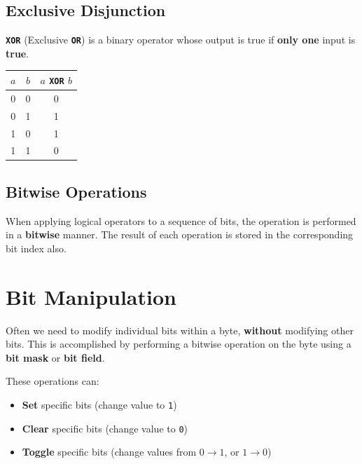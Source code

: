 \documentclass[a4paper]{report}
\newcommand{\keywordinline}[1]{\textcolor[rgb]{0.00,0.50,0.00}{\textbf{\texttt{#1}}}}
\begin{document}
\subsection{Exclusive Disjunction}
\keywordinline{XOR} (Exclusive \keywordinline{OR}) is a binary operator whose output is true if \textbf{only one} input is \textbf{true}.
\begin{table}[H]
    \centering
    \begin{tabular}{c c c}
        \toprule
        \textbf{\(a\)} & \textbf{\(b\)} & \(a\) \keywordinline{XOR} \(b\) \\
        \midrule
        0              & 0              & 0                               \\
        0              & 1              & 1                               \\
        1              & 0              & 1                               \\
        1              & 1              & 0                               \\
        \bottomrule
    \end{tabular}
\end{table}
\subsection{Bitwise Operations}
When applying logical operators to a sequence of bits, the operation is performed in a \textbf{bitwise} manner. The result of each operation is stored in the corresponding bit index also.
\section{Bit Manipulation}
Often we need to modify individual bits within a byte, \textbf{without} modifying other bits.
This is accomplished by performing a bitwise operation on the byte using a \textbf{bit mask} or \textbf{bit field}.

These operations can:
\begin{itemize}
    \item \textbf{Set} specific bits (change value to \texttt{1})
    \item \textbf{Clear} specific bits (change value to \texttt{0})
    \item \textbf{Toggle} specific bits (change values from \(0 \to 1\), or \(1 \to 0\))
\end{itemize}
\end{document}
